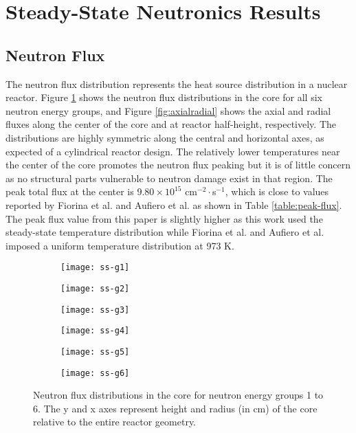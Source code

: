 \section{Steady-State Neutronics Results}

\subsection{Neutron Flux}

The neutron flux distribution represents the heat source distribution in a
nuclear reactor. Figure \ref{fig:neutronflux} shows the neutron flux
distributions in the core for all six neutron energy groups, and Figure
\ref{fig:axialradial} shows the axial and radial fluxes along the center of
the core and at reactor half-height, respectively.
The distributions are highly symmetric along the
central and horizontal axes, as expected of a cylindrical reactor design. The
relatively lower temperatures near the center of the core promotes the neutron
flux peaking but it is of little concern as no structural parts vulnerable to
neutron damage exist in that region. The peak total flux at the center is
$9.80 \times 10^{15}$ cm$^{-2}\cdot$s$^{-1}$, which is close to values
reported by Fiorina et al. \cite{fiorina_molten_2013} and Aufiero et al.
\cite{aufiero_development_2014} as shown in Table \ref{table:peak-flux}. The
peak flux value from this paper is slightly higher as this work used the
steady-state temperature distribution while Fiorina et al. and Aufiero et al.
imposed a uniform temperature distribution at 973 K.

\begin{figure}[b!]
    \centering
    \begin{subfigure}[t]{.325\textwidth}
        \centering
        \texttt{[image: ss-g1]}
    \end{subfigure}
    \begin{subfigure}[t]{.325\textwidth}
        \centering
        \texttt{[image: ss-g2]}
    \end{subfigure}
    \begin{subfigure}[t]{.325\textwidth}
        \centering
        \texttt{[image: ss-g3]}
    \end{subfigure}
    \begin{subfigure}[t]{.325\textwidth}
        \centering
        \texttt{[image: ss-g4]}
    \end{subfigure}
    \begin{subfigure}[t]{.325\textwidth}
        \centering
        \texttt{[image: ss-g5]}
    \end{subfigure}
    \begin{subfigure}[t]{.325\textwidth}
        \centering
        \texttt{[image: ss-g6]}
    \end{subfigure}
    \caption{Neutron flux distributions in the core for neutron energy groups
    1 to 6. The y and x axes represent height and radius (in cm) of the core
    relative to the entire reactor geometry.}
    \label{fig:neutronflux}
\end{figure}

